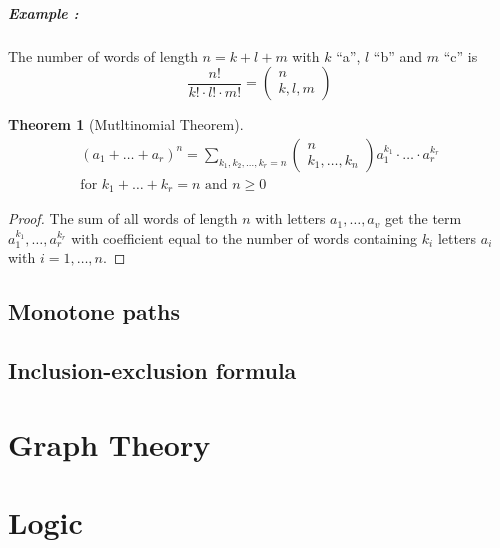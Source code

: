 \documentclass[a4paper,11pt]{report}
\newtheorem{theorem}{Theorem}
\begin{document}
\paragraph{Example : } The number of words of length $n = k + l + m$ with $k$
``a'', $l$ ``b'' and $m$ ``c'' is
\[
  \frac{n!}{k! \cdot l! \cdot m!} = \begin{pmatrix} n \\ k,l,m\end{pmatrix}
\]

\begin{theorem}[Mutltinomial Theorem]
  \begin{gather*}
    (a_1 + \dots + a_r)^n = \sum_{k_1,k_2,\dots,k_r = n}\begin{pmatrix} n \\
      k_1,\dots,k_n\end{pmatrix} a_1^{k_1} \cdot \dots \cdot a_r^{k_r} \\
    \text{for } k_1 + \dots + k_r = n \text{ and } n \geq 0
  \end{gather*}
\end{theorem}

\begin{proof}
  The sum of all words of length $n$ with letters $a_1,\dots,a_v$ get the term
  $a_1^{k_1},\dots,a_r^{k_r}$ with coefficient equal to the number of words
  containing $k_i$ letters $a_i$ with $i = 1,\dots,n$.
\end{proof}

\section{Monotone paths}

\section{Inclusion-exclusion formula}

\chapter{Graph Theory}

\chapter{Logic}
\end{document}
